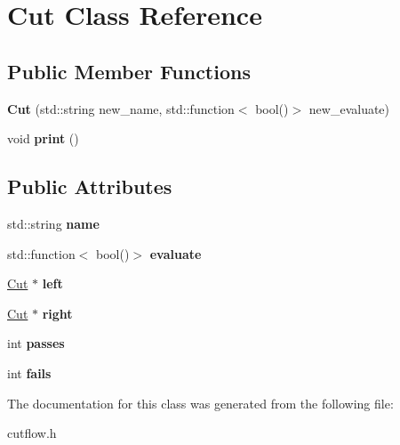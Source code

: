 \hypertarget{classCut}{}\section{Cut Class Reference}
\label{classCut}
\subsection*{Public Member Functions}
\begin{DoxyCompactItemize}
\item 
{\bfseries Cut} (std\+::string new\+\_\+name, std\+::function$<$ bool()$>$ new\+\_\+evaluate)\hypertarget{classCut_aaa89435c5326080296041bc38937ab2d}{}\label{classCut_aaa89435c5326080296041bc38937ab2d}

\item 
void {\bfseries print} ()\hypertarget{classCut_a9b1298219ed1f85bba920e4049d712e3}{}\label{classCut_a9b1298219ed1f85bba920e4049d712e3}

\end{DoxyCompactItemize}
\subsection*{Public Attributes}
\begin{DoxyCompactItemize}
\item 
std\+::string {\bfseries name}\hypertarget{classCut_accf700d2d00746b97a265d4aea3f55c2}{}\label{classCut_accf700d2d00746b97a265d4aea3f55c2}

\item 
std\+::function$<$ bool()$>$ {\bfseries evaluate}\hypertarget{classCut_a4205ad5e62b859536797141f3ace2253}{}\label{classCut_a4205ad5e62b859536797141f3ace2253}

\item 
\hyperlink{classCut}{Cut} $\ast$ {\bfseries left}\hypertarget{classCut_a2c65e372172dfa0f705d117d3ad0f668}{}\label{classCut_a2c65e372172dfa0f705d117d3ad0f668}

\item 
\hyperlink{classCut}{Cut} $\ast$ {\bfseries right}\hypertarget{classCut_a2142ffe68028bb0c211408c0f5bb8bfb}{}\label{classCut_a2142ffe68028bb0c211408c0f5bb8bfb}

\item 
int {\bfseries passes}\hypertarget{classCut_a9ec802667c770787a473c622208ef35c}{}\label{classCut_a9ec802667c770787a473c622208ef35c}

\item 
int {\bfseries fails}\hypertarget{classCut_a7bfcec46b8c2879a9660ac7656ed7b83}{}\label{classCut_a7bfcec46b8c2879a9660ac7656ed7b83}

\end{DoxyCompactItemize}


The documentation for this class was generated from the following file\+:\begin{DoxyCompactItemize}
\item 
cutflow.\+h\end{DoxyCompactItemize}
